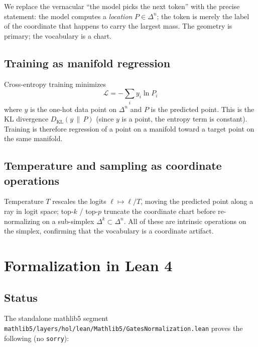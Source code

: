 \documentclass[11pt]{article}
\newcommand{\simplex}[1]{\Delta^{#1}}
\begin{document}
We replace the vernacular ``the model picks the next token'' with the precise
statement: the model computes a \emph{location} $P\in\simplex{n}$; the token is
merely the label of the coordinate that happens to carry the largest mass. The
geometry is primary; the vocabulary is a chart.

\subsection{Training as manifold regression}
\label{sec:llm-train}

Cross-entropy training minimizes
\[
\mathcal{L} = -\sum_i y_i \ln P_i
\]
where $y$ is the one-hot data point on $\simplex{n}$ and $P$ is the predicted
point. This is the KL divergence $D_{\mathrm{KL}}(y\,\|\,P)$ (since $y$ is a
point, the entropy term is constant). Training is therefore regression of a
point on a manifold toward a target point on the same manifold.

\subsection{Temperature and sampling as coordinate operations}
\label{sec:llm-temp}

Temperature $T$ rescales the logits $\ell\mapsto \ell/T$, moving the predicted
point along a ray in logit space; top-$k$ / top-$p$ truncate the coordinate
chart before re-normalizing on a sub-simplex $\simplex{k}\subset\simplex{n}$.
All of these are intrinsic operations on the simplex, confirming that the
vocabulary is a coordinate artifact.

\section{Formalization in Lean 4}
\label{sec:lean}

\subsection{Status}
\label{sec:lean-status}

The standalone mathlib5 segment
\texttt{mathlib5/layers/hol/lean/Mathlib5/GatesNormalization.lean} proves the
following (no \texttt{sorry}):
\end{document}
